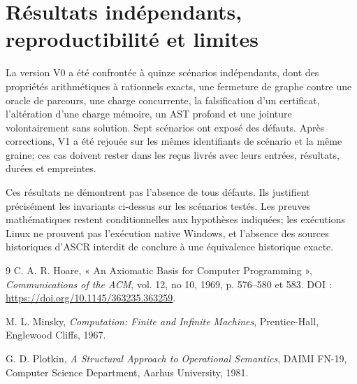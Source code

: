 \documentclass[11pt,a4paper,openany]{book}
\theoremstyle{definition}
\theoremstyle{plain}
\theoremstyle{remark}
\begin{document}
\section{Résultats indépendants, reproductibilité et limites}
La version V0 a été confrontée à quinze scénarios indépendants, dont des propriétés arithmétiques à rationnels exacts, une fermeture de graphe contre une oracle de parcours, une charge concurrente, la falsification d'un certificat, l'altération d'une charge mémoire, un AST profond et une jointure volontairement sans solution. Sept scénarios ont exposé des défauts. Après corrections, V1 a été rejouée sur les mêmes identifiants de scénario et la même graine; ces cas doivent rester dans les reçus livrés avec leurs entrées, résultats, durées et empreintes.

Ces résultats ne démontrent pas l'absence de tous défauts. Ils justifient précisément les invariants ci-dessus sur les scénarios testés. Les preuves mathématiques restent conditionnelles aux hypothèses indiquées; les exécutions Linux ne prouvent pas l'exécution native Windows, et l'absence des sources historiques d'ASCR interdit de conclure à une équivalence historique exacte.


\backmatter
\begin{thebibliography}{9}
C. A. R. Hoare, « An Axiomatic Basis for Computer Programming », \emph{Communications of the ACM}, vol. 12, no 10, 1969, p. 576--580 et 583. DOI : \url{https://doi.org/10.1145/363235.363259}.

M. L. Minsky, \emph{Computation: Finite and Infinite Machines}, Prentice-Hall, Englewood Cliffs, 1967.

G. D. Plotkin, \emph{A Structural Approach to Operational Semantics}, DAIMI FN-19, Computer Science Department, Aarhus University, 1981.

\end{thebibliography}
\end{document}
